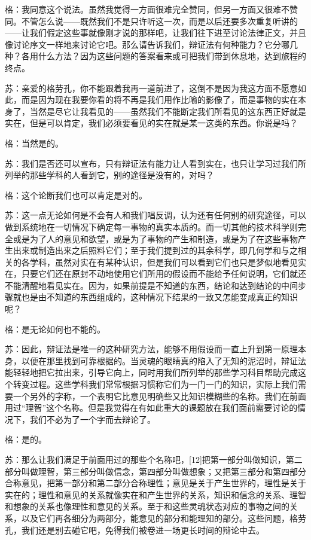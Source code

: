 \documentclass[12pt,oneside]{book}
\begin{document}
格：我同意这个说法。虽然我觉得一方面很难完全赞同，但另一方面又很难不赞同。不管怎么说——既然我们不是只许听这一次，而是以后还要多次重复听讲的——让我们假定这些事就像刚才说的那样吧，让我们往下进至讨论法律正文，并且像讨论序文一样地来讨论它吧。那么请告诉我们，辩证法有何种能力？它分哪几种？各用什么方法？因为这些问题的答案看来或可把我们带到休息地，达到旅程的终点。

苏：亲爱的格劳孔，你不能跟着我再一道前进了，这倒不是因为我这方面不愿意如此，而是因为现在我要你看的将不再是我们用作比喻的影像了，而是事物的实在本身了，当然是尽它让我看见的——虽然我们不能断定我们所看见的这东西正好就是实在，但是可以肯定，我们必须要看见的实在就是某一这类的东西。你说是吗？

格：当然是的。

苏：我们是否还可以宣布，只有辩证法有能力让人看到实在，也只让学习过我们所列举的那些学科的人看到它，别的途径是没有的，对吗？

格：这个论断我们也可以肯定是对的。

苏：这一点无论如何是不会有人和我们唱反调，认为还有任何别的研究途径，可以做到系统地在一切情况下确定每一事物的真实本质的。而一切其他的技术科学则完全或是为了人的意见和欲望，或是为了事物的产生和制造，或是为了在这些事物产生出来或制造出来之后照料它们；至于我们提到过的其余科学，即几何学和与之相关的各学科，虽然对实在有某种认识，但是我们可以看到它们也只是梦似地看见实在，只要它们还在原封不动地使用它们所用的假设而不能给予任何说明，它们就还不能清醒地看见实在。因为，如果前提是不知道的东西，结论和达到结论的中间步骤就也是由不知道的东西组成的，这种情况下结果的一致又怎能变成真正的知识呢？

格：是无论如何也不能的。

苏：因此，辩证法是唯一的这种研究方法，能够不用假设而一直上升到第一原理本身，以便在那里找到可靠根据的。当灵魂的眼睛真的陷入了无知的泥沼时，辩证法能轻轻地把它拉出来，引导它向上，同时用我们所列举的那些学习科目帮助完成这个转变过程。这些学科我们常常根据习惯称它们为一门一门的知识，实际上我们需要一个另外的字称，一个表明它比意见明确些又比知识模糊些的名称。我们在前面用过“理智”这个名称。但是我觉得在有如此重大的课题放在我们面前需要讨论的情况下，我们不必为了一个字而去辩论了。

格：是的。

苏：那么让我们满足于前面用过的那些个名称吧，[12]把第一部分叫做知识，第二部分叫做理智，第三部分叫做信念，第四部分叫做想象；又把第三部分和第四部分合称意见，把第一部分和第二部分合称理性；意见是关于产生世界的，理性是关于实在的；理性和意见的关系就像实在和产生世界的关系，知识和信念的关系、理智和想象的关系也像理性和意见的关系。至于和这些灵魂状态对应的事物之间的关系，以及它们再各细分为两部分，能意见的部分和能理知的部分。这些问题，格劳孔，我们还是别去碰它吧，免得我们被卷进一场更长时间的辩论中去。
\end{document}
